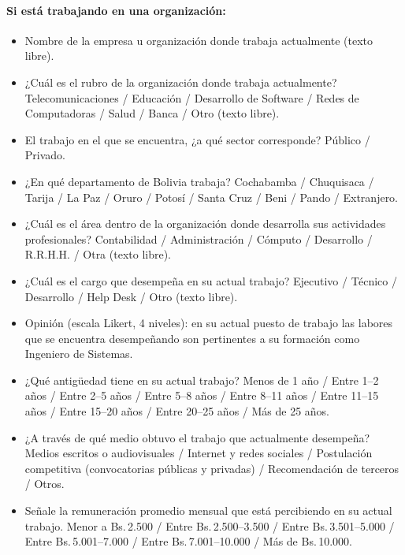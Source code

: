 \documentclass[12pt]{article}
\begin{document}
\paragraph{Si está trabajando en una organización:}
\begin{itemize}[nosep]
    \item Nombre de la empresa u organización donde trabaja actualmente
    (texto libre).
    \item ¿Cuál es el rubro de la organización donde trabaja actualmente?
    Telecomunicaciones / Educación / Desarrollo de Software / Redes de
    Computadoras / Salud / Banca / Otro (texto libre).
    \item El trabajo en el que se encuentra, ¿a qué sector corresponde?
    Público / Privado.
    \item ¿En qué departamento de Bolivia trabaja? Cochabamba /
    Chuquisaca / Tarija / La Paz / Oruro / Potosí / Santa Cruz / Beni /
    Pando / Extranjero.
    \item ¿Cuál es el área dentro de la organización donde desarrolla sus
    actividades profesionales? Contabilidad / Administración / Cómputo /
    Desarrollo / R.R.H.H. / Otra (texto libre).
    \item ¿Cuál es el cargo que desempeña en su actual trabajo? Ejecutivo
    / Técnico / Desarrollo / Help Desk / Otro (texto libre).
    \item Opinión (escala Likert, 4 niveles): en su actual puesto de
    trabajo las labores que se encuentra desempeñando son pertinentes a
    su formación como Ingeniero de Sistemas.
    \item ¿Qué antigüedad tiene en su actual trabajo? Menos de 1 año /
    Entre 1--2 años / Entre 2--5 años / Entre 5--8 años / Entre 8--11 años
    / Entre 11--15 años / Entre 15--20 años / Entre 20--25 años / Más de
    25 años.
    \item ¿A través de qué medio obtuvo el trabajo que actualmente
    desempeña? Medios escritos o audiovisuales / Internet y redes
    sociales / Postulación competitiva (convocatorias públicas y
    privadas) / Recomendación de terceros / Otros.
    \item Señale la remuneración promedio mensual que está percibiendo en
    su actual trabajo. Menor a Bs.\,2.500 / Entre Bs.\,2.500--3.500 /
    Entre Bs.\,3.501--5.000 / Entre Bs.\,5.001--7.000 / Entre
    Bs.\,7.001--10.000 / Más de Bs.\,10.000.
\end{itemize}
\end{document}
